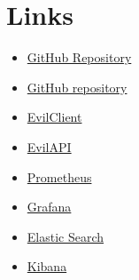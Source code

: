 

    \section{Links}
        \begin{itemize}
            \item \href{https://github.com/gustavjohansen98/E-vil-Corp}{GitHub Repository}
            \item \href{https://github.com/gustavjohansen98/E-vil-Corp/projects/1}{GitHub repository}
            \item \href{http://159.89.213.38:5000/public}{EvilClient}
            \item \href{http://159.89.213.38:5010/latest}{EvilAPI}
            \item \href{http://159.89.213.38:9090/}{Prometheus}
            \item \href{http://159.89.213.38:3000/}{Grafana}
            \item \href{http://159.89.213.38:9200/}{Elastic Search}
            \item \href{http://159.89.213.38:5601/app/home}{Kibana}
        \end{itemize}
